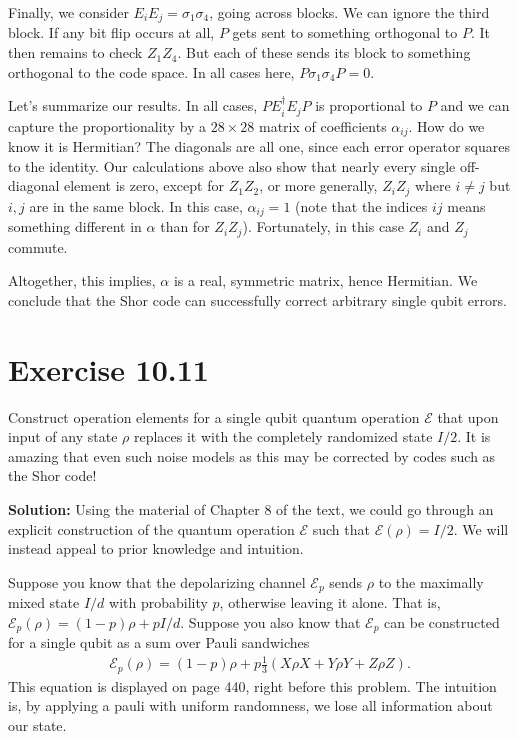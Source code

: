 \documentclass{book}
\newcommand{\mc}[1]{\mathcal{#1}}
\begin{document}
    Finally, we consider $E_i E_j = \sigma_1 \sigma_4$, going across blocks. We can ignore the third block. If any bit flip occurs at all, $P$ gets sent to something orthogonal to $P$. It then remains to check $Z_1 Z_4$. But each of these sends its block to something orthogonal to the code space. In all cases here, $P \sigma_1 \sigma_4 P  = 0$.

    Let's summarize our results. In all cases, $P E_i^\dagger E_j P$ is proportional to $P$ and we can capture the proportionality by a $28 \times 28$ matrix of coefficients $\alpha_{ij}$. How do we know it is Hermitian? The diagonals are all one, since each error operator squares to the identity. Our calculations above also show that nearly every single off-diagonal element is zero, except for $Z_1 Z_2$, or more generally, $Z_i Z_j$ where $i\neq j$ but $i, j$ are in the same block. In this case, $\alpha_{ij}= 1$ (note that the indices $ij$ means something different in $\alpha$ than for $Z_i Z_j$). Fortunately, in this case $Z_i$ and $Z_j$ commute. 
    
    Altogether, this implies, $\alpha$ is a real, symmetric matrix, hence Hermitian. We conclude that the Shor code can successfully correct arbitrary single qubit errors.

\section*{Exercise 10.11}
    Construct operation elements for a single qubit quantum operation $\mc{E}$ that upon input of any state $\rho$ replaces it with the completely randomized state $I/2$. It is amazing that even such noise models as this may be corrected by codes such as the Shor code!

    \textbf{Solution:} Using the material of Chapter 8 of the text, we could go through an explicit construction of the quantum operation $\mc{E}$ such that $\mc{E}(\rho) = I/2$. We will instead appeal to prior knowledge and intuition.

    Suppose you know that the depolarizing channel $\mc{E}_p$ sends $\rho$ to the maximally mixed state $I/d$ with probability $p$, otherwise leaving it alone. That is, $\mc{E}_p (\rho) = (1-p)\rho + p I /d$. Suppose you also know that $\mc{E}_p$ can be constructed for a single qubit as a sum over Pauli sandwiches
    \begin{align}
        \mc{E}_p (\rho) = (1-p)\rho + p \frac{1}{3} (X\rho X + Y \rho Y + Z\rho Z).
    \end{align}
    This equation is displayed on page 440, right before this problem. The intuition is, by applying a pauli with uniform randomness, we lose all information about our state.
\end{document}
